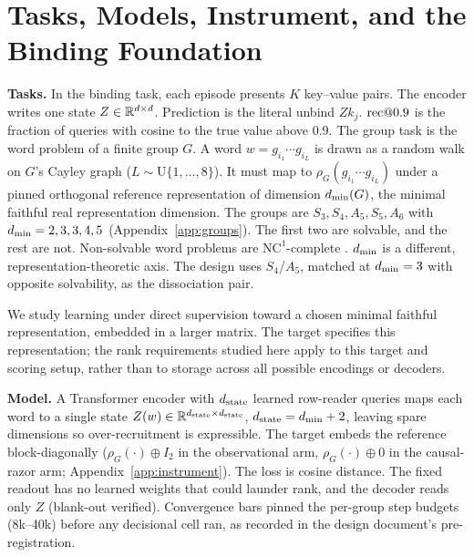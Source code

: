 \section{Tasks, Models, Instrument, and the Binding Foundation}
\label{sec:setup}

\textbf{Tasks.} In the binding task, each episode presents $K$ key--value
pairs. The encoder writes one state $Z \in \mathbb{R}^{d \times d}$. Prediction is
the literal unbind $Z k_j$. $\mathrm{rec}@0.9$ is the fraction of queries with
cosine to the true value above 0.9. The group task is the word problem of a
finite group $G$. A word $w = g_{i_1} \cdots g_{i_L}$ is drawn as a random
walk on $G$'s Cayley graph ($L \sim \mathrm{U}\{1,\dots,8\}$). It must map
to $\rho_G(g_{i_1} \cdots g_{i_L})$ under a pinned orthogonal reference
representation of dimension $d_{\min}(G)$, the minimal faithful real
representation dimension. The groups are $S_3, S_4, A_5, S_5, A_6$ with
$d_{\min} = 2, 3, 3, 4, 5$ (Appendix~\ref{app:groups}). The first two are
solvable, and the rest are not. Non-solvable word problems are
$\mathrm{NC}^1$-complete \citep{barrington1989,barringtontherien1988}.
$d_{\min}$ is a different, representation-theoretic axis. The design uses
$S_4$/$A_5$, matched at $d_{\min} = 3$ with opposite solvability, as the
dissociation pair.

We study learning under direct supervision toward a chosen minimal
faithful representation, embedded in a larger matrix. The target
specifies this representation; the rank requirements studied here apply
to this target and scoring setup, rather than to storage across all
possible encodings or decoders.

\textbf{Model.} A Transformer encoder with $d_{\mathrm{state}}$ learned row-reader
queries maps each word to a single state
$Z(w) \in \mathbb{R}^{d_{\mathrm{state}} \times d_{\mathrm{state}}}$, $d_{\mathrm{state}} = d_{\min} + 2$, leaving
spare dimensions so over-recruitment is expressible. The target embeds
the reference block-diagonally ($\rho_G(\cdot) \oplus I_2$ in the
observational arm, $\rho_G(\cdot) \oplus 0$ in the causal-razor arm;
Appendix~\ref{app:instrument}). The loss is cosine distance. The fixed
readout has no learned weights that could launder rank, and the decoder
reads only $Z$ (blank-out verified). Convergence bars pinned the per-group step
budgets (8k--40k) before any decisional cell ran, as recorded in the design
document's pre-registration.

